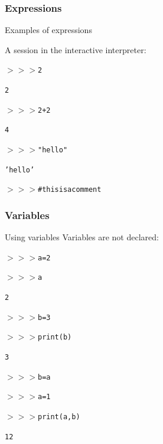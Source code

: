 \documentclass[xcolor=pdftex,dvipsnames,table,mathserif]{beamer}
\begin{document}
\begin{frame}
  \frametitle{Expressions}

  \begin{block}{Examples of expressions}

    A session in the interactive interpreter:
    \begin{alltt}
      $>>>$ 2

      2

      $>>>$ 2+2

      4

      $>>>$ "hello"

      'hello'

      $>>>$ \# this is a comment
    \end{alltt}
  \end{block}
\end{frame}

\begin{frame}
  \frametitle{Variables}

  \begin{block}{Using variables}
    Variables are not declared:
    \begin{alltt}
      $>>>$ a = 2

      $>>>$ a

      2

      $>>>$ b = 3

      $>>>$ print(b)

      3

      $>>>$ b = a

      $>>>$ a = 1

      $>>>$ print(a,b)

      1 2
    \end{alltt}
  \end{block}
\end{frame}
\end{document}
